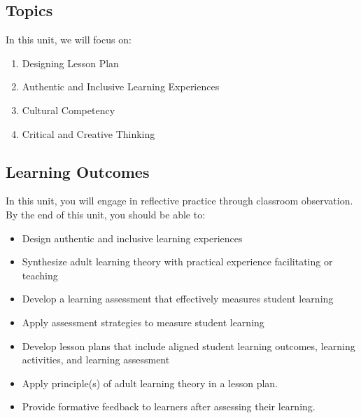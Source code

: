 \documentclass[
]{book}
\providecommand{\tightlist}{%
  \setlength{\itemsep}{0pt}\setlength{\parskip}{0pt}}
\begin{document}
\hypertarget{topics-3}{%
\subsection*{Topics}\label{topics-3}}

In this unit, we will focus on:

\begin{enumerate}
\def\labelenumi{\arabic{enumi}.}
\tightlist
\item
  Designing Lesson Plan\\
\item
  Authentic and Inclusive Learning Experiences\\
\item
  Cultural Competency\\
\item
  Critical and Creative Thinking
\end{enumerate}

\hypertarget{learning-outcomes-4}{%
\subsection*{Learning Outcomes}\label{learning-outcomes-4}}

In this unit, you will engage in reflective practice through classroom observation. By the end of this unit, you should be able to:

\begin{itemize}
\tightlist
\item
  Design authentic and inclusive learning experiences\\
\item
  Synthesize adult learning theory with practical experience facilitating or teaching\\
\item
  Develop a learning assessment that effectively measures student learning\\
\item
  Apply assessment strategies to measure student learning\\
\item
  Develop lesson plans that include aligned student learning outcomes, learning activities, and learning assessment\\
\item
  Apply principle(s) of adult learning theory in a lesson plan.\\
\item
  Provide formative feedback to learners after assessing their learning.
\end{itemize}
\end{document}
